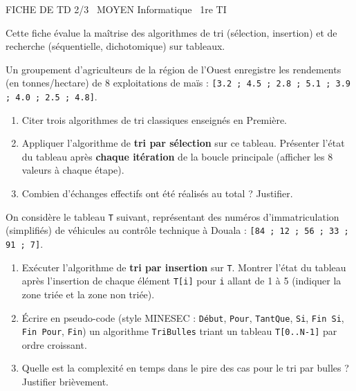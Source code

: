 \documentclass[11pt]{article}
\begin{document}
\begin{tcolorbox}[enhanced,colback=popink,colframe=popink,arc=10pt,boxrule=0pt,left=12pt,right=12pt,top=9pt,bottom=9pt]
{\color{white}\popxbold\small FICHE DE TD 2/3 \textbullet\ MOYEN \hfill Informatique \textbullet\ 1re TI\par}
\end{tcolorbox}
\vspace{4pt}
Cette fiche évalue la maîtrise des algorithmes de tri (sélection, insertion) et de recherche (séquentielle, dichotomique) sur tableaux.

\begin{exercice}
Un groupement d'agriculteurs de la région de l'Ouest enregistre les rendements (en tonnes/hectare) de 8 exploitations de maïs : 
\texttt{[3.2 ; 4.5 ; 2.8 ; 5.1 ; 3.9 ; 4.0 ; 2.5 ; 4.8]}.
\begin{enumerate}
    \item Citer trois algorithmes de tri classiques enseignés en Première.
    \item Appliquer l'algorithme de \textbf{tri par sélection} sur ce tableau. Présenter l'état du tableau après \textbf{chaque itération} de la boucle principale (afficher les 8 valeurs à chaque étape).
    \item Combien d'échanges effectifs ont été réalisés au total ? Justifier.
\end{enumerate}
\end{exercice}

\begin{exercice}
On considère le tableau \texttt{T} suivant, représentant des numéros d'immatriculation (simplifiés) de véhicules au contrôle technique à Douala : 
\texttt{[84 ; 12 ; 56 ; 33 ; 91 ; 7]}.
\begin{enumerate}
    \item Exécuter l'algorithme de \textbf{tri par insertion} sur \texttt{T}. Montrer l'état du tableau après l'insertion de chaque élément \texttt{T[i]} pour \texttt{i} allant de 1 à 5 (indiquer la zone triée et la zone non triée).
    \item Écrire en pseudo-code (style MINESEC : \texttt{Début}, \texttt{Pour}, \texttt{TantQue}, \texttt{Si}, \texttt{Fin Si}, \texttt{Fin Pour}, \texttt{Fin}) un algorithme \texttt{TriBulles} triant un tableau \texttt{T[0..N-1]} par ordre croissant.
    \item Quelle est la complexité en temps dans le pire des cas pour le tri par bulles ? Justifier brièvement.
\end{enumerate}
\end{exercice}
\end{document}
